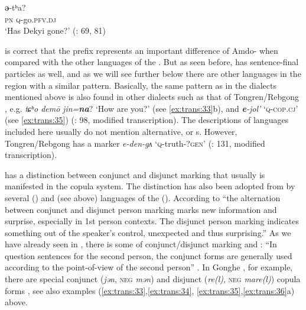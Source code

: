     \ex
     \textbf{{ə}}{-t}{ʰ}a?\\
    \textsc{pn}    \textsc{q}-go.\textsc{pfv.dj}\\
    \glt ‘Has Dekyi gone?’ (\citealt{Haller2004}: 69, 81)
    \z
    \z

\citet[184]{Janhunen2012a} is correct that the prefix represents an important difference of Amdo- when compared with the other languages of the . But as seen before,  has sentence-final particles as well, and as we will see further below there are other languages in the region with a similar pattern. Basically, the same pattern as in the dialects mentioned above is also found in other dialects such as that of Tongren/Rebgong , e.g. \textit{tɕʰ}\textit{o demō} \textit{jin=}\textbf{\textit{na}}? ‘How are you?’ (see \ref{ex:trans:33}b), and \textbf{\textit{e}}\textit{-jol’} ‘\textsc{q}-\textsc{cop.cj}’ (see \ref{ex:trans:35}) (\citealt{deRoerich1958}: 98, modified transcription). The descriptions of  languages included here usually do not mention alternative,  or s. However, Tongren/Rebgong  has a  marker \textit{e-den-gʌ} ‘\textsc{q}-truth-?\textsc{gen}’ (\citealt{deRoerich1958}: 131, modified transcription).

 has a distinction between conjunct and disjunct marking that usually is manifested in the copula system. The distinction has also been adopted from  by several  () and  (see above) languages of the  (). According to \citet[471]{Aikhenvald2012} “the alternation between conjunct and disjunct person marking marks new information and surprise, especially in 1st person contexts. The disjunct person marking indicates something out of the speaker’s control, unexpected and thus surprising.” As we have already seen in , there is some  of conjunct/disjunct marking and : “In question sentences for the second person, the conjunct forms are generally used according to the point-of-view of the second person” \citep[69]{Ebihara2011}. In Gonghe , for example, there are special conjunct (\textit{jən}, \textsc{neg} \textit{mən}) and disjunct (\textit{re(l)}, \textsc{neg} \textit{mare(l)}) copula forms \citep[69]{Ebihara2011}, see also examples (\ref{ex:trans:33},\ref{ex:trans:34}, \ref{ex:trans:35},\ref{ex:trans:36}a) above.

